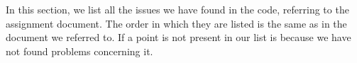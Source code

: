 In this section, we list all the issues we have found in the code, referring to the assignment document. The order in which they are listed is the same as in the document we referred to. If a point is not present in our list is because we have not found problems concerning it.





\begin{comment}
    ----------------------------------------------------------------------------------------------------------------------------------------------------------------------------------------------------------------------------------------------
    \begin{enumerate}
        \item There are some variables, such as "ae, resp, rd,..." that have name too short, so that it is not easy to understand their meaning. Maybe they can be consider throwaway variables.
        \item Okay - all classes: there are no one-character variables
        \item Okay - all class
        \item Okay - all class
        \item In the function "validateRequest", a method is called "basic(...)" which is not a verb
        \item Okay - all class
        \item Okay in methods.
            In the class declaration: \\private static final Logger logger = GuiUtil.getLogger();. 'logger' should be "LOGGER"
        \item Okay - All document
        \item Okay - All document
        \item Okay - All document: the bracing style used in all document is the 'Kernighan and Ritchie' style
        \item Okay - both methods
        \item Okay - all document - are we sure?! -> SURE!
        \item More than 80 chars in a line
                \begin{itemize}
                    \item class document: SUPPORTED\_MESSAGE\_TYPES attribute declaration, public void cleanSubject method declaration, public AuthStatus secureResponse method declaration

\end{comment}
